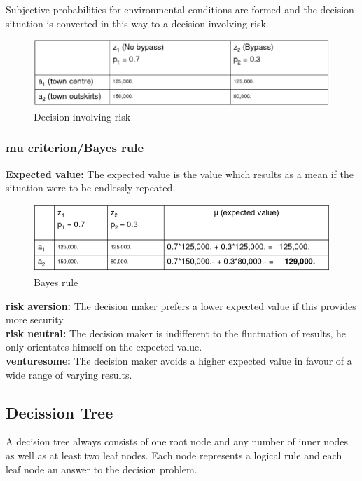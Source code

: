 Subjective probabilities for environmental conditions are formed and the
decision situation is converted in this way to a decision involving
risk.

\begin{figure}
\centering
\includegraphics{figures/logicalDecisionMaking.png}
\caption{Decision involving risk}
\end{figure}

\hypertarget{mu-criterionbayes-rule}{%
\subsubsection{mu criterion/Bayes rule}\label{mu-criterionbayes-rule}}

\textbf{Expected value:} The expected value is the value which results
as a mean if the situation were to be endlessly repeated.

\begin{figure}
\centering
\includegraphics{figures/bayesRule.png}
\caption{Bayes rule}
\end{figure}

\textbf{risk aversion:} The decision maker prefers a lower expected
value if this provides more security.\\
\textbf{risk neutral:} The decision maker is indifferent to the
fluctuation of results, he only orientates himself on the expected
value.\\
\textbf{venturesome:} The decision maker avoids a higher expected value
in favour of a wide range of varying results.

\hypertarget{decission-tree}{%
\subsection{Decission Tree}\label{decission-tree}}

A decision tree always consists of one root node and any number of inner
nodes as well as at least two leaf nodes. Each node represents a logical
rule and each leaf node an answer to the decision problem.

